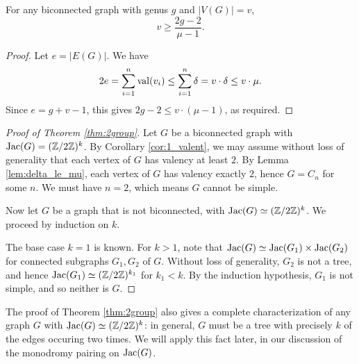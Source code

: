 \documentclass{amsart}
\begin{document}
\begin{cor}
  \label{cor:genus_v_mu}
  For any biconnected graph with genus $g$ and $|V(G)| = v$,
  \begin{equation*}
    v \ge \frac{2g - 2}{\mu - 1}.
  \end{equation*}
\end{cor}
\begin{proof}
  Let $e = |E(G)|$. We have 
  \begin{equation*}
    2e = \sum_{i=1}^n \operatorname{val}(v_i) \le \sum_{i=1}^n \delta = v \cdot \delta
    \le v \cdot \mu.
  \end{equation*}
  Since $e = g + v - 1$, this gives $2g - 2 \le v \cdot (\mu - 1)$, as required.
\end{proof}

\begin{proof}[Proof of Theorem \ref{thm:2group}]
  Let $G$ be a biconnected graph with $\operatorname{Jac}(G) = (\mathbb{Z}/2\mathbb{Z})^k$. By
  Corollary \ref{cor:1_valent}, we may assume without loss of
  generality that each vertex of $G$ has valency at least $2$. By
  Lemma \ref{lem:delta_le_mu}, each vertex of $G$ has valency exactly
  $2$, hence $G = C_n$ for some $n$. We must have $n=2$, which means $G$
  cannot be simple.

  Now let $G$ be a graph that is not biconnected, with $\operatorname{Jac}(G) \simeq
  (\mathbb{Z}/2\mathbb{Z})^k$. We proceed by induction on $k$.
  
  The base case $k=1$ is known. For $k > 1$, note that $\operatorname{Jac}(G) \simeq
  \operatorname{Jac}(G_1) \times \operatorname{Jac}(G_2)$ for connected subgraphs $G_1, G_2$ of
  $G$. Without loss of generality, $G_2$ is not a tree, and
  hence $\operatorname{Jac}(G_1) \simeq (\mathbb{Z}/2\mathbb{Z})^{k_1}$ for $k_1 < k$. By the
  induction hypothesis, $G_1$ is not simple, and so neither is $G$.
\end{proof}

\begin{remark}
  The proof of Theorem \ref{thm:2group} also gives a complete
  characterization of any graph $G$ with $\operatorname{Jac}(G) \simeq
  (\mathbb{Z}/2\mathbb{Z})^k$: in general, $G$ must be a tree with precisely $k$ of
  the edges occuring two times. We will apply this fact later, in our
  discussion of the monodromy pairing on $\operatorname{Jac}(G)$.
\end{remark}
\end{document}
